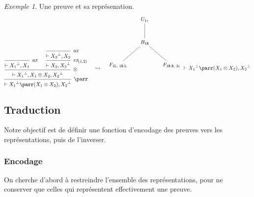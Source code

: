 \documentclass[11pt,a4paper]{article}
\theoremstyle{plain}
\theoremstyle{definition}
\theoremstyle{remark}
\newtheorem{example}{Exemple}
\newcommand*{\orth}{^\perp}
\newcommand*{\tensor}{\otimes}
\newcommand*{\axv}[1]{\infer{0}[\ensuremath{\mathit{ax}}]{\vdash #1}}
\newcommand*{\tensorv}[1]{\infer{2}[\ensuremath{\tensor}]{\vdash #1}}
\newcommand*{\parrv}[1]{\infer{1}[\ensuremath{\parr}]{\vdash #1}}
\newcommand*{\permv}[2]{\infer{1}[\ensuremath{\textit{ex}_{#1}}]{\vdash #2}}
\newcommand*{\Left}{\textnormal{\texttt{L}}}
\newcommand*{\Right}{\textnormal{\texttt{R}}}
\begin{document}
\begin{example}
Une preuve et sa représenation.
\begin{equation*}
\begin{prooftree}
    \axv{{X_1}\orth, X_1}
    \axv{{X_2}\orth, X_2}
    \permv{(1,2)}{X_2, {X_2}\orth}
    \tensorv{{X_1}\orth, X_1 \tensor X_2, {X_2}\orth}
    \parrv{{X_1}\orth \parr (X_1 \tensor X_2), {X_2}\orth}
\end{prooftree}
\quad\leadsto\quad
\begin{tikzpicture}%
    [level distance=1.5cm,
    level 2/.style={sibling distance=3.5cm}]
    \node {$U_{1 \epsilon}$}
    child {node {$B_{1 \Right}$}
        child {node {$F_{1 \Left, \; 1 \Right \cdot \Left}$}}
        child {node {$F_{1 \Right \cdot \Right, \; 2 \epsilon}$}}
    };
\end{tikzpicture}
\vdash {X_1}\orth \parr (X_1 \tensor X_2), {X_2}\orth
\end{equation*}
\end{example}

\subsection{Traduction}
Notre objectif est de définir une fonction d'encodage des preuves vers les représentations, puis de l'inverser.

\subsubsection{Encodage}
On cherche d'abord à restreindre l'ensemble des représentations, pour ne conserver que celles qui représentent effectivement une preuve.
\end{document}
